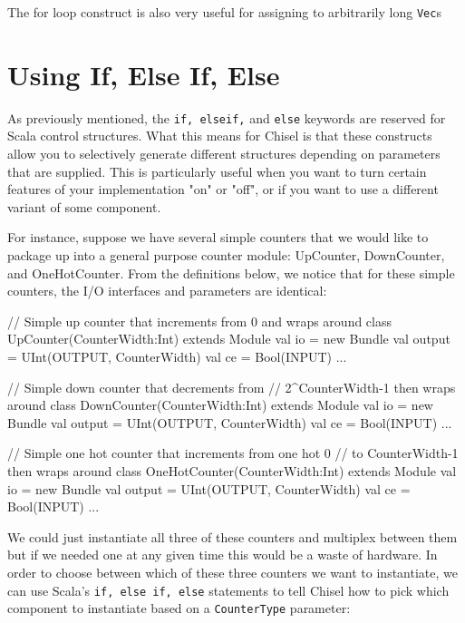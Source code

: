 \documentclass[twocolumn, 10pt]{article}
\begin{document}
The for loop construct is also very useful for assigning to arbitrarily long \verb+Vec+s 

\section{Using If, Else If, Else}

As previously mentioned, the \verb+if, elseif,+ and \verb+else+ keywords are reserved for Scala control structures. What this means for Chisel is that these constructs allow you to selectively generate different structures depending on parameters that are supplied. This is particularly useful when you want to turn certain features of your implementation "on" or "off", or if you want to use a different variant of some component.

For instance, suppose we have several simple counters that we would like to package up into a general purpose counter module: UpCounter, DownCounter, and OneHotCounter. From the definitions below, we notice that for these simple counters, the I/O interfaces and parameters are identical:

\begin{scala}
// Simple up counter that increments from 0 and wraps around
class UpCounter(CounterWidth:Int) extends Module {
  val io = new Bundle {
    val output = UInt(OUTPUT, CounterWidth)
    val ce     = Bool(INPUT)
  }...
}

// Simple down counter that decrements from 
// 2^CounterWidth-1 then wraps around
class DownCounter(CounterWidth:Int) extends Module{
  val io = new Bundle {
    val output = UInt(OUTPUT, CounterWidth)
    val ce     = Bool(INPUT)
  }...
}

// Simple one hot counter that increments from one hot 0 
// to CounterWidth-1 then wraps around
class OneHotCounter(CounterWidth:Int) extends Module {
  val io = new Bundle {
      val output = UInt(OUTPUT, CounterWidth)
      val ce     = Bool(INPUT)
  }...
}
\end{scala}

We could just instantiate all three of these counters and multiplex between them but if we needed one at any given time this would be a waste of hardware. In order to choose between which of these three counters we want to instantiate, we can use Scala's \verb+if, else if, else+ statements to tell Chisel how to pick which component to instantiate based on a \verb+CounterType+ parameter:
\end{document}

